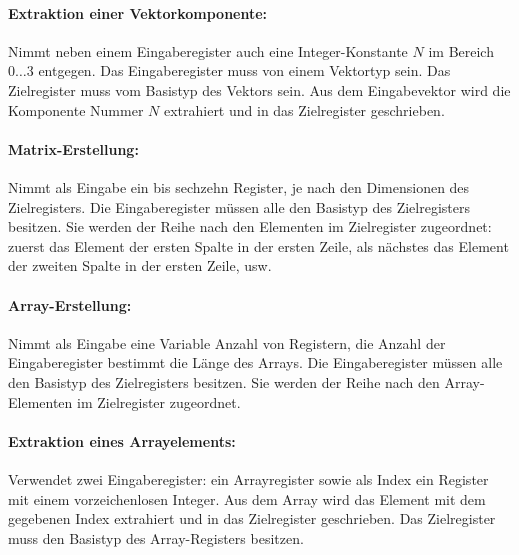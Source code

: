 \documentclass[twoside,a4paper,fleqn,12pt]{article}
\begin{document}
\paragraph{Extraktion einer Vektorkomponente:} Nimmt neben einem Eingaberegister auch eine Integer-Konstante $N$ im Bereich $0 \dots 3$ entgegen.
Das Eingaberegister muss von einem Vektortyp sein. Das Zielregister muss vom Basistyp des Vektors sein.
Aus dem Eingabevektor wird die Komponente Nummer $N$ extrahiert und in das Zielregister geschrieben.

\paragraph{Matrix-Erstellung:} Nimmt als Eingabe ein bis sechzehn Register, je nach den Dimensionen des Zielregisters. Die Eingaberegister müssen alle
den Basistyp des Zielregisters besitzen. Sie werden der Reihe nach den Elementen im Zielregister zugeordnet: zuerst das Element der ersten Spalte in der ersten Zeile,
als nächstes das Element der zweiten Spalte in der ersten Zeile, usw.

\paragraph{Array-Erstellung:} Nimmt als Eingabe eine Variable Anzahl von Registern, die Anzahl der Eingaberegister bestimmt die Länge des Arrays.
Die Eingaberegister müssen alle den Basistyp des Zielregisters besitzen. Sie werden der Reihe nach den Array-Elementen im Zielregister zugeordnet.

\paragraph{Extraktion eines Arrayelements:} Verwendet zwei Eingaberegister: ein Arrayregister sowie als Index ein Register mit einem vorzeichenlosen Integer.
Aus dem Array wird das Element mit dem gegebenen Index extrahiert und in das Zielregister geschrieben.
Das Zielregister muss den Basistyp des Array-Registers besitzen.
\end{document}
